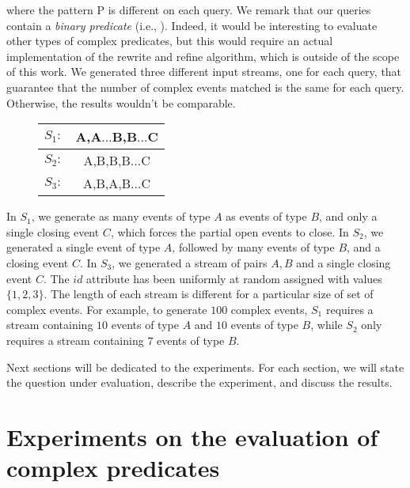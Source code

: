 where the pattern \textrm{P} is different on each query. We remark that our queries contain a \emph{binary predicate} (i.e., ). Indeed, it would be interesting to evaluate other types of complex predicates, but this would require an actual implementation of the rewrite and refine algorithm, which is outside of the scope of this work. We generated three different input streams, one for each query, that guarantee that the number of complex events matched is the same for each query. Otherwise, the results wouldn't be comparable.

\begin{figure}[H]
  \centering
  \begin{tabular}{l c}
    \hline
    $S_{1}:$ & A,A$\ldots$B,B$\ldots$C\\
    \hline
    $S_{2}:$ & A,B,B,B$\ldots$C\\
    \hline
    $S_{3}:$ & A,B,A,B$\ldots$C\\
    \hline
  \end{tabular}
\end{figure}

In $S_{1}$, we generate as many events of type $A$ as events of type $B$, and only a single closing event $C$, which forces the partial open events to close. In $S_{2}$, we generated a single event of type $A$, followed by many events of type $B$, and a closing event $C$. In $S_{3}$, we generated a stream of pairs $A, B$ and a single closing event $C$. The $id$ attribute has been uniformly at random assigned with values $\{1, 2, 3\}$. The length of each stream is different for a particular size of set of complex events. For example, to generate $100$ complex events, $S_{1}$ requires a stream containing $10$ events of type $A$ and $10$ events of type $B$, while $S_{2}$ only requires a stream containing $7$ events of type $B$.

Next sections will be dedicated to the experiments. For each section, we will state the question under evaluation, describe the experiment, and discuss the results.

\section{Experiments on the evaluation of complex predicates}\label{sec:predicates}

